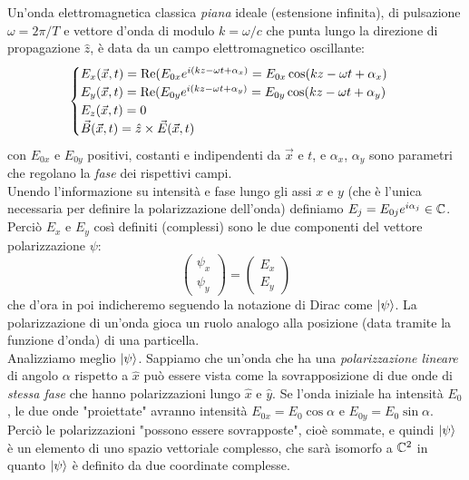 \documentclass[FisicaTeorica.tex]{subfiles}
\begin{document}
Un'onda elettromagnetica classica \textit{piana} ideale (estensione infinita), di pulsazione $\omega = 2\pi/T$ e vettore d'onda di modulo $k = \omega/c$ che punta lungo la direzione di propagazione $\hat{z}$, è data da un campo elettromagnetico oscillante:
\[
\begin{cases}
E_x(\vec{x},t) = \op{Re}(E_{0x} e^{i(kz-\omega t + \alpha_x)} = E_{0x}\cos(kz-\omega t+\alpha_x)\\
E_y(\vec{x},t) = \op{Re}(E_{0y} e^{i(kz-\omega t + \alpha_y)} = E_{0y}\cos(kz-\omega t+\alpha_y)\\
E_z(\vec{x},t) = 0\\
\vec{B}(\vec{x},t) = \hat{z} \times \vec{E}(\vec{x},t) %
\end{cases}
\]
con $E_{0x}$ e $E_{0y}$ positivi, costanti e indipendenti da $\vec{x}$ e $t$, e $\alpha_x$, $\alpha_y$ sono parametri che regolano la \textit{fase} dei rispettivi campi.\\
Unendo l'informazione su intensità e fase lungo gli assi $x$ e $y$ (che è l'unica necessaria per definire la polarizzazione dell'onda) definiamo $E_j = E_{0j} e^{i\alpha_j} \in \mathbb{C}$. Perciò $E_x$ e $E_y$ così definiti (complessi) sono le due componenti del vettore  polarizzazione $\psi$:
\[
\begin{pmatrix}
\psi_x\\ \psi_y
\end{pmatrix} = \begin{pmatrix}
E_x\\
E_y
\end{pmatrix}
\]
che d'ora in poi indicheremo seguendo la notazione di Dirac come $\ket{\psi}$. La polarizzazione di un'onda gioca un ruolo analogo alla posizione (data tramite la funzione d'onda) di una particella.\\
Analizziamo meglio $\ket{\psi}$. Sappiamo che un'onda che ha una \textit{polarizzazione lineare} di angolo $\alpha$ rispetto a $\hat{x}$ può essere vista come la sovrapposizione di due onde di \textit{stessa fase} che hanno polarizzazioni lungo $\hat{x}$ e $\hat{y}$. Se l'onda iniziale ha intensità $E_0$, le due onde "proiettate" avranno intensità $E_{0x} = E_0\cos\alpha$ e $E_{0y} = E_0\sin\alpha$.\\ %
Perciò le polarizzazioni "possono essere sovrapposte", cioè sommate, e quindi $\ket{\psi}$ è un elemento di uno spazio vettoriale complesso, che sarà isomorfo a $\mathbb{C}^2$ in quanto $\ket{\psi}$ è definito da due coordinate complesse.\\
\end{document}

